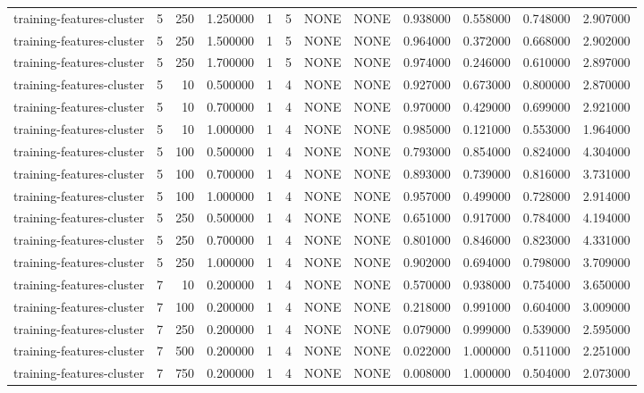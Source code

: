 \begin{tabular}{lrrrllllrrrr}
training-features-cluster & 5 & 250 & 1.250000 & 1 & 5 & NONE & NONE & 0.938000 & 0.558000 & 0.748000 & 2.907000 \\
training-features-cluster & 5 & 250 & 1.500000 & 1 & 5 & NONE & NONE & 0.964000 & 0.372000 & 0.668000 & 2.902000 \\
training-features-cluster & 5 & 250 & 1.700000 & 1 & 5 & NONE & NONE & 0.974000 & 0.246000 & 0.610000 & 2.897000 \\
training-features-cluster & 5 & 10 & 0.500000 & 1 & 4 & NONE & NONE & 0.927000 & 0.673000 & 0.800000 & 2.870000 \\
training-features-cluster & 5 & 10 & 0.700000 & 1 & 4 & NONE & NONE & 0.970000 & 0.429000 & 0.699000 & 2.921000 \\
training-features-cluster & 5 & 10 & 1.000000 & 1 & 4 & NONE & NONE & 0.985000 & 0.121000 & 0.553000 & 1.964000 \\
training-features-cluster & 5 & 100 & 0.500000 & 1 & 4 & NONE & NONE & 0.793000 & 0.854000 & 0.824000 & 4.304000 \\
training-features-cluster & 5 & 100 & 0.700000 & 1 & 4 & NONE & NONE & 0.893000 & 0.739000 & 0.816000 & 3.731000 \\
training-features-cluster & 5 & 100 & 1.000000 & 1 & 4 & NONE & NONE & 0.957000 & 0.499000 & 0.728000 & 2.914000 \\
training-features-cluster & 5 & 250 & 0.500000 & 1 & 4 & NONE & NONE & 0.651000 & 0.917000 & 0.784000 & 4.194000 \\
training-features-cluster & 5 & 250 & 0.700000 & 1 & 4 & NONE & NONE & 0.801000 & 0.846000 & 0.823000 & 4.331000 \\
training-features-cluster & 5 & 250 & 1.000000 & 1 & 4 & NONE & NONE & 0.902000 & 0.694000 & 0.798000 & 3.709000 \\
training-features-cluster & 7 & 10 & 0.200000 & 1 & 4 & NONE & NONE & 0.570000 & 0.938000 & 0.754000 & 3.650000 \\
training-features-cluster & 7 & 100 & 0.200000 & 1 & 4 & NONE & NONE & 0.218000 & 0.991000 & 0.604000 & 3.009000 \\
training-features-cluster & 7 & 250 & 0.200000 & 1 & 4 & NONE & NONE & 0.079000 & 0.999000 & 0.539000 & 2.595000 \\
training-features-cluster & 7 & 500 & 0.200000 & 1 & 4 & NONE & NONE & 0.022000 & 1.000000 & 0.511000 & 2.251000 \\
training-features-cluster & 7 & 750 & 0.200000 & 1 & 4 & NONE & NONE & 0.008000 & 1.000000 & 0.504000 & 2.073000 \\

\end{tabular}
